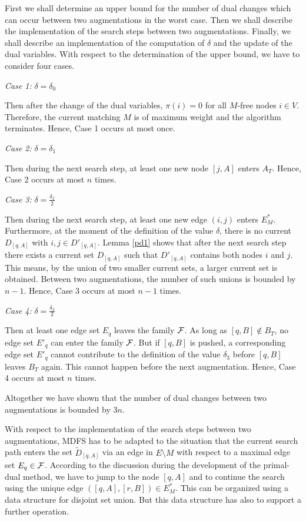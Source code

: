 \documentclass[12pt,twoside,a4paper]{article}
\begin{document}
First we shall determine an upper bound for the number of dual changes which can occur between 
two augmentations in the worst case. Then we shall describe the implementation of the search
steps between two augmentations. Finally, we shall describe an implementation of the
computation of $\delta$ and the update of the dual variables. With respect to the determination
of the upper bound, we have to consider four cases.

\medskip
\noindent
{\em Case 1:\/} $\delta = \delta_0$

\medskip
Then after the change of the dual variables, $\pi(i) = 0$ for all $M$-free nodes
$i \in V$. Therefore, the current matching $M$ is of maximum weight and the 
algorithm terminates. Hence, Case 1 occurs at most once.

\medskip
\noindent
{\em Case 2:\/} $\delta = \delta_1$

\medskip
Then during the next search step, at least one new node $[j,A]$ enters $A_T$.
Hence, Case 2 occurs at most $n$ times.

\medskip
\noindent
{\em Case 3:\/} $\delta = \frac{\delta_2}{2}$

\medskip
Then during the next search step, at least one new edge $(i,j)$ enters 
$E^*_M$. Furthermore, at the moment of the definition of the value $\delta$,
there is no current $D_{[q,A]}$ with $i,j \in D'_{[q,A]}$. Lemma \ref{pd1}
shows that after the next search step there exists a current set $D_{[q,A]}$
such that $D'_{[q,A]}$ contains both nodes $i$ and $j$. This means, by the
union of two smaller current sets, a larger current set is obtained. 
Between two augmentations, the number of such unions is bounded by $n-1$.
Hence, Case 3 occurs at most $n-1$ times. 

\medskip
\noindent
{\em Case 4:\/} $\delta = \frac{\delta_3}{2}$

\medskip
Then at least one edge set $E_q$ leaves the family $\cal F$. As long as 
$[q,B] \not\in B_T$, no edge set $E'_q$ can enter the family $\cal F$.
But if $[q,B]$ is pushed, a corresponding edge set $E'_q$ cannot contribute to 
the definition of the value $\delta_3$ before $[q,B]$ leaves $B_T$ again. 
This cannot happen before the next augmentation. Hence, Case 4 occurs at most 
$n$ times.

\medskip
Altogether we have shown that the number of dual changes between two augmentations
is bounded by $3n$.

\medskip
With respect to the implementation of the search steps between two augmentations,
MDFS has to be adapted to the situation that the current search path enters
the set $\tilde{D}_{[q,A]}$ via an edge in $E \setminus M$
with respect to a maximal edge set $E_q \in \cal F$.
According to the discussion during the development of the primal-dual method,
we have to jump to the node $[q,A]$ and to continue the search using the unique edge
$([q,A],[r,B]) \in E^*_M$. This can be organized using a data structure for
disjoint set union. But this data structure has also to support a further operation.
\end{document}
